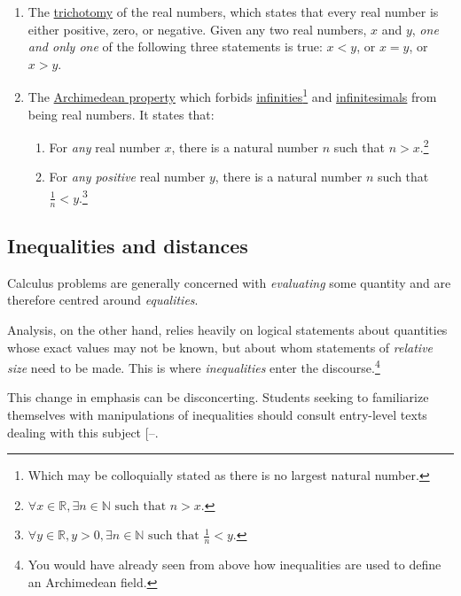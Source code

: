 \documentclass[
  a4paper,
]{article}
\providecommand{\tightlist}{%
  \setlength{\itemsep}{0pt}\setlength{\parskip}{0pt}}
\begin{document}
\begin{enumerate}
\def\labelenumi{\alph{enumi}.}
\item
  The \href{https://en.wikipedia.org/wiki/Law_of_trichotomy}{trichotomy}
  of the real numbers, which states that every real number is either
  positive, zero, or negative. Given any two real numbers, \(x\) and
  \(y\), \emph{one and only one} of the following three statements is
  true: \(x < y\), or \(x = y\), or \(x > y\).
\item
  The \href{https://planetmath.org/archimedeanproperty}{Archimedean
  property} which forbids
  \href{https://en.wikipedia.org/wiki/Infinity}{infinities}\footnote{Which
    may be colloquially stated as there is no largest natural number.}
  and \href{https://en.wikipedia.org/wiki/Infinitesimal}{infinitesimals}
  from being real numbers. It states that:

  \begin{enumerate}
  \def\labelenumii{(\roman{enumii})}
  \tightlist
  \item
    For \emph{any} real number \(x\), there is a natural number \(n\)
    such that \(n > x\).\footnote{\(\forall x \in \mathbb{R}, \exists n \in \mathbb{N} \text{ such that } n > x.\)}
  \item
    For \emph{any positive} real number \(y\), there is a natural number
    \(n\) such that \(\frac{1}{n} < y\).\footnote{\(\forall y \in \mathbb{R}, y > 0, \exists n \in \mathbb{N} \text{ such that } \frac{1}{n} < y\).}
  \end{enumerate}
\end{enumerate}

\subsection{Inequalities and
distances}\label{inequalities-and-distances}

Calculus problems are generally concerned with \emph{evaluating} some
quantity and are therefore centred around \emph{equalities}.

Analysis, on the other hand, relies heavily on logical statements about
quantities whose exact values may not be known, but about whom
statements of \emph{relative size} need to be made. This is where
\emph{inequalities} enter the discourse.\footnote{You would have already
  seen from above how inequalities are used to define an Archimedean
  field.}

This change in emphasis can be disconcerting. Students seeking to
familiarize themselves with manipulations of inequalities should consult
entry-level texts dealing with this subject
{[}--\citeproc{ref-alsina-nelsen-2009}{3}{]}.
\end{document}
